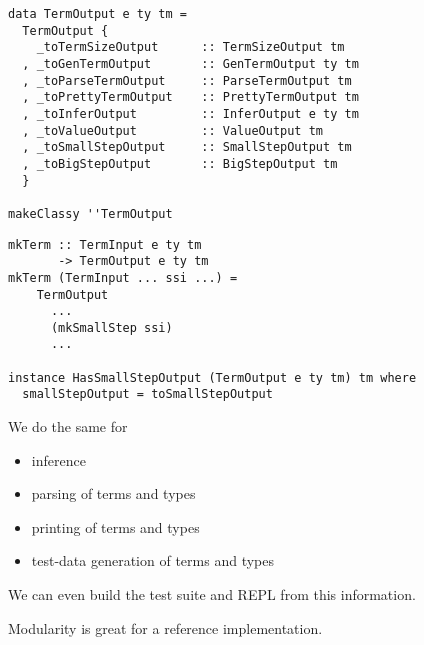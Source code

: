\documentclass{beamer}
\begin{document}
\begin{frame}[fragile]
  \begin{verbatim}
data TermOutput e ty tm =
  TermOutput {
    _toTermSizeOutput      :: TermSizeOutput tm
  , _toGenTermOutput       :: GenTermOutput ty tm
  , _toParseTermOutput     :: ParseTermOutput tm
  , _toPrettyTermOutput    :: PrettyTermOutput tm
  , _toInferOutput         :: InferOutput e ty tm
  , _toValueOutput         :: ValueOutput tm
  , _toSmallStepOutput     :: SmallStepOutput tm
  , _toBigStepOutput       :: BigStepOutput tm
  }

makeClassy ''TermOutput
  \end{verbatim}
\end{frame} 

\begin{frame}[fragile]
  \begin{verbatim}
mkTerm :: TermInput e ty tm
       -> TermOutput e ty tm
mkTerm (TermInput ... ssi ...) =
    TermOutput
      ...
      (mkSmallStep ssi)
      ...

instance HasSmallStepOutput (TermOutput e ty tm) tm where
  smallStepOutput = toSmallStepOutput
  \end{verbatim}
\end{frame} 

\begin{frame}[c]
  \begin{center}
  We do the same for 
  \begin{itemize}
    \item inference
    \item parsing of terms and types
    \item printing of terms and types
    \item test-data generation of terms and types
  \end{itemize}
  \end{center}
\end{frame} 

\begin{frame}[c]
  \begin{center}
   We can even build the test suite and REPL from this information.
  \end{center}
\end{frame} 

\begin{frame}[c]
  \begin{center}
   Modularity is great for a reference implementation.
  \end{center}
\end{frame} 
\end{document}

